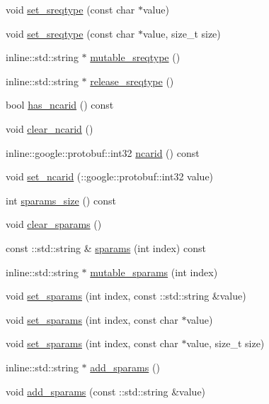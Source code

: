 \begin{DoxyCompactItemize}
\item 
void \hyperlink{classRequest_ac1247a4297c4e1e3cb1a728f85bc462d}{set\-\_\-sreqtype} (const char $\ast$value)
\item 
void \hyperlink{classRequest_af9e71ac70b7cecaf7a4e2025d623df83}{set\-\_\-sreqtype} (const char $\ast$value, size\-\_\-t size)
\item 
inline\-::std\-::string $\ast$ \hyperlink{classRequest_a4838843a323351f49d3e5b65c0cf7d1f}{mutable\-\_\-sreqtype} ()
\item 
inline\-::std\-::string $\ast$ \hyperlink{classRequest_ac4d58c4f750f9d49a0fc495dcbfe9d7a}{release\-\_\-sreqtype} ()
\item 
bool \hyperlink{classRequest_af6df5287650bd448767ef11be2b74953}{has\-\_\-ncarid} () const 
\item 
void \hyperlink{classRequest_a3e099ce1ad3b4d66b177cf028b31b6c2}{clear\-\_\-ncarid} ()
\item 
inline\-::google\-::protobuf\-::int32 \hyperlink{classRequest_aae13661c498dc7269fac803ed663cca1}{ncarid} () const 
\item 
void \hyperlink{classRequest_a63e86b65e7f2f717e916fa2164a1ad49}{set\-\_\-ncarid} (\-::google\-::protobuf\-::int32 value)
\item 
int \hyperlink{classRequest_a2d1718b434695a0583ec1c76f68936d5}{sparams\-\_\-size} () const 
\item 
void \hyperlink{classRequest_a40cbf199353091ffcdcc94c0b07a4ccf}{clear\-\_\-sparams} ()
\item 
const \-::std\-::string \& \hyperlink{classRequest_a935dd441238779cf4214e3a08297de74}{sparams} (int index) const 
\item 
inline\-::std\-::string $\ast$ \hyperlink{classRequest_a71f83e559f19aa855094eed1c4c2094f}{mutable\-\_\-sparams} (int index)
\item 
void \hyperlink{classRequest_ad4e8400e321a1e314035760aa7dbce2e}{set\-\_\-sparams} (int index, const \-::std\-::string \&value)
\item 
void \hyperlink{classRequest_abd491451db3e121edc07d19bc965e7d6}{set\-\_\-sparams} (int index, const char $\ast$value)
\item 
void \hyperlink{classRequest_af40396e7bdb124d7c8277d076e84a578}{set\-\_\-sparams} (int index, const char $\ast$value, size\-\_\-t size)
\item 
inline\-::std\-::string $\ast$ \hyperlink{classRequest_a763f0f5196dcb7502207820afe7c7fcb}{add\-\_\-sparams} ()
\item 
void \hyperlink{classRequest_abc6f99596caf8d9f5815cd47e74844c6}{add\-\_\-sparams} (const \-::std\-::string \&value)

\end{DoxyCompactItemize}
